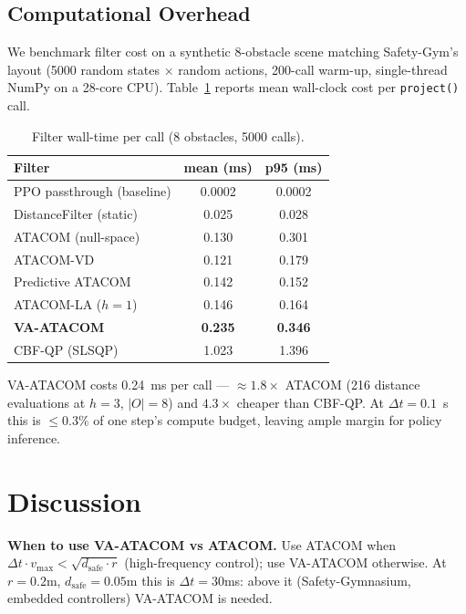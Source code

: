 \documentclass[letterpaper]{article}
\begin{document}
\subsection{Computational Overhead}

We benchmark filter cost on a synthetic 8-obstacle scene matching Safety-Gym's layout (5000 random states $\times$ random actions, 200-call warm-up, single-thread NumPy on a 28-core CPU). Table~\ref{tab:walltime} reports mean wall-clock cost per \texttt{project()} call.

\begin{table}[t]
\centering
\caption{Filter wall-time per call (8 obstacles, 5000 calls).}
\label{tab:walltime}
\begin{tabular}{lcc}
\toprule
Filter & mean (ms) & p95 (ms) \\
\midrule
PPO passthrough (baseline) & 0.0002 & 0.0002 \\
DistanceFilter (static)    & 0.025  & 0.028  \\
ATACOM (null-space)        & 0.130  & 0.301  \\
ATACOM-VD                  & 0.121  & 0.179  \\
Predictive ATACOM          & 0.142  & 0.152  \\
ATACOM-LA ($h{=}1$)        & 0.146  & 0.164  \\
\textbf{VA-ATACOM}         & \textbf{0.235} & \textbf{0.346} \\
CBF-QP (SLSQP)             & 1.023  & 1.396  \\
\bottomrule
\end{tabular}
\end{table}

VA-ATACOM costs 0.24~ms per call --- $\approx 1.8\times$ ATACOM (216 distance evaluations at $h{=}3$, $|O|{=}8$) and $4.3\times$ cheaper than CBF-QP. At $\Delta t{=}0.1$~s this is $\le 0.3\%$ of one step's compute budget, leaving ample margin for policy inference.

\section{Discussion}

\textbf{When to use VA-ATACOM vs ATACOM.} Use ATACOM when $\Delta t \cdot v_{\max} < \sqrt{d_\text{safe} \cdot r}$ (high-frequency control); use VA-ATACOM otherwise. At $r{=}0.2$m, $d_\text{safe}{=}0.05$m this is $\Delta t{=}30$ms: above it (Safety-Gymnasium, embedded controllers) VA-ATACOM is needed.
\end{document}
